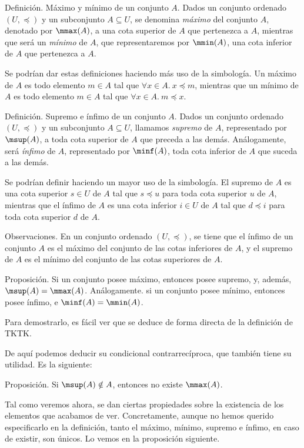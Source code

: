 Definición. Máximo y mínimo de un conjunto $A$. Dados un conjunto ordenado
$(U, \preceq)$ y un subconjunto $A \subseteq U$, se denomina \emph{máximo}
del conjunto $A$, denotado por $\mmax(A)$, a una cota superior de $A$ que
pertenezca a $A$, mientras que será un \emph{mínimo} de $A$, que
representaremos por $\mmin(A)$, una cota inferior de $A$ que pertenezca a
$A$.

Se podrían dar estas definiciones haciendo más uso de la simbología. Un
máximo de $A$ es todo elemento $m \in A$ tal que $\forall x \in A. \ x
\preceq m$, mientras que un mínimo de $A$ es todo elemento $m \in A$ tal que
$\forall x \in A. \ m \preceq x$.

Definición. Supremo e ínfimo de un conjunto $A$. Dados un conjunto ordenado
$(U, \preceq)$ y un subconjunto $A \subseteq U$, llamamos \emph{supremo} de
$A$, representado por $\msup(A)$, a toda cota superior de $A$ que preceda a
las demás. Análogamente, será \emph{ínfimo} de $A$, representado por
$\minf(A)$, toda cota inferior de $A$ que suceda a las demás.

Se podrían definir haciendo un mayor uso de la simbología. El supremo de $A$
es una cota superior $s \in U$ de $A$ tal que $s \preceq u$ para toda cota
superior $u$ de $A$, mientras que el ínfimo de $A$ es una cota inferior $i
\in U$ de $A$ tal que $d \preceq i$ para toda cota superior $d$ de $A$.

Observaciones. En un conjunto ordenado $(U, \preceq)$, se tiene que el
ínfimo de un conjunto $A$ es el máximo del conjunto de las cotas inferiores
de $A$, y el supremo de $A$ es el mínimo del conjunto de las cotas
superiores de $A$.

Proposición. Si un conjunto posee máximo, entonces posee supremo, y, además,
$\msup(A) = \mmax(A)$. Análogamente. si un conjunto posee mínimo, entonces
posee ínfimo, e $\minf(A) = \mmin(A)$.

Para demostrarlo, es fácil ver que se deduce de forma directa de la
definición de TKTK.


De aquí podemos deducir su condicional contrarrecíproca, que también tiene
su utilidad. Es la siguiente:

Proposición. Si $\msup(A) \notin A$, entonces no existe $\mmax(A)$.

Tal como veremos ahora, se dan ciertas propiedades sobre la existencia de
los elementos que acabamos de ver. Concretamente, aunque no hemos querido
especificarlo en la definición, tanto el máximo, mínimo, supremo e ínfimo,
en caso de existir, son únicos. Lo vemos en la proposición siguiente.

